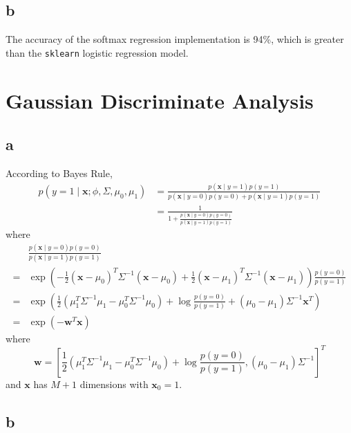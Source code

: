 \documentclass{article}
\begin{document}
\subsection*{b}

The accuracy of the softmax regression implementation is 94\%, which is greater than the \texttt{sklearn} logistic regression model.

\section{Gaussian Discriminate Analysis}

\subsection*{a}

According to Bayes Rule,
$$
\begin{aligned}
p(y=1 \mid \mathbf{x} ; \phi, \Sigma, \mu_{0}, \mu_{1}) &=\frac{p(\mathbf{x} \mid y=1) p(y=1)}{p(\mathbf{x} \mid y=0) p(y=0)+p(\mathbf{x} \mid y=1) p(y=1)} \\
& = \frac{1}{1+\frac{p(\mathbf{x} \mid y=0) p(y=0)}{p(\mathbf{x} \mid y=1) p(y=1)}}
\end{aligned}
$$
where
$$
\begin{aligned}
& \frac{p(\mathbf{x} \mid y=0) p(y=0)}{p(\mathbf{x} \mid y=1) p(y=1)} \\ 
= & \exp (-\frac{1}{2}(\mathbf{x}-\mu_{0})^{T} \Sigma^{-1}(\mathbf{x}-\mu_{0})+\frac{1}{2}(\mathbf{x}-\mu_{1})^{T} \Sigma^{-1}(\mathbf{x}-\mu_{1})) \frac{p(y=0)}{p(y=1)} \\
= & \exp (\frac{1}{2}(\mu_{1}^{T} \Sigma^{-1} \mu_{1}-\mu_{0}^{T} \Sigma^{-1} \mu_{0}) + \log \frac{p(y=0)}{p(y=1)} + (\mu_{0}-\mu_{1}) \Sigma^{-1} \mathbf{x}^{T}) \\
= & \exp (-\mathbf{w}^{T} \mathbf{x})
\end{aligned}
$$
where
$$
\mathbf{w} = \left[\frac{1}{2}(\mu_{1}^{T} \Sigma^{-1} \mu_{1}-\mu_{0}^{T} \Sigma^{-1} \mu_{0}) + \log \frac{p(y=0)}{p(y=1)}, (\mu_0 - \mu_1) \Sigma^{-1}  \right]^T
$$
and $\mathbf{x}$ has $M+1$ dimensions with $\mathbf{x}_0 = 1$. 

\subsection*{b}
\end{document}
